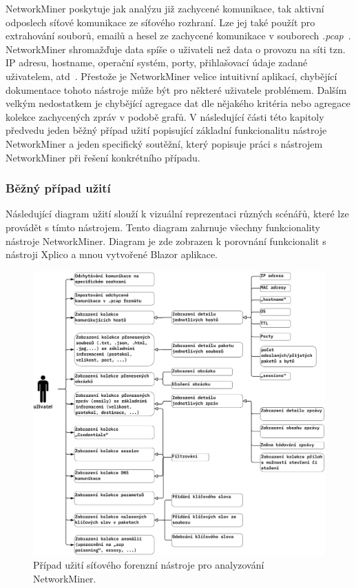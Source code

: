         NetworkMiner poskytuje jak analýzu již zachycené komunikace, tak aktivní odposlech síťové komunikace ze síťového rozhraní. Lze jej také použít pro extrahování souborů, emailů a hesel ze zachycené komunikace v souborech \textit{.pcap}~\cite{NetworkMinerReference}. NetworkMiner shromažďuje data spíše o uživateli než data o provozu na síti tzn. \gls{IP} adresu, hostname, operační systém, porty, přihlašovací údaje zadané uživatelem, atd~\cite{FundamentalsOfNetworkForensicsReference}. Přestože je NetworkMiner velice intuitivní aplikací, chybějící dokumentace tohoto nástroje může být pro některé uživatele problémem. Dalším velkým nedostatkem je chybějící agregace dat dle nějakého kritéria nebo agregace kolekce zachycených zpráv v podobě grafů. V následující části této kapitoly předvedu jeden běžný případ užití popisující základní funkcionalitu nástroje NetworkMiner a jeden specifický soutěžní, který popisuje práci s nástrojem NetworkMiner při řešení konkrétního případu.
       
        \subsubsection*{Běžný případ užití}
            Následující diagram užití slouží k vizuální reprezentaci různých scénářů, které lze provádět s tímto nástrojem. Tento diagram zahrnuje všechny funkcionality nástroje NetworkMiner. Diagram je zde zobrazen k porovnání funkcionalit s nástroji Xplico a mnou vytvořené Blazor aplikace.
            \begin{figure}[H]
                \centering
                \includegraphics[scale=0.1]{obrazky-figures/usecases/NetworkMiner_usecase.jpg}
                \caption{Případ užití síťového forenzní nástroje pro analyzování NetworkMiner.}
                \label{fig:my_label}
            \end{figure}
